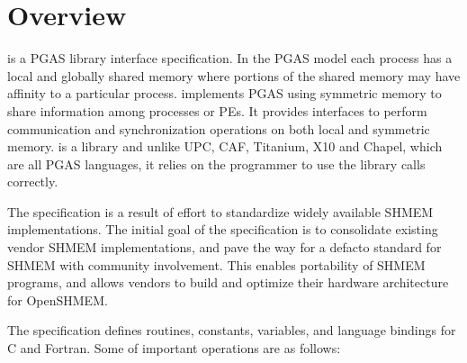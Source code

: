 \section{Overview}
\openshmem is a \ac{PGAS} library interface specification. In the \ac{PGAS} model each process has a local and 
globally shared memory where portions of the shared memory may have affinity to a particular process. \openshmem 
implements \ac{PGAS} using symmetric memory to share information among processes or \ac{PE}s.   
It provides interfaces to perform communication and synchronization operations on both local and symmetric memory. 
\openshmem is a library and unlike UPC, CAF, Titanium, X10 and Chapel, which are all
PGAS languages, it relies on the programmer to use the library calls correctly.

The \openshmem specification is a result of effort to standardize widely available SHMEM implementations. 
The initial goal of the specification is to consolidate existing vendor SHMEM implementations, and  pave the way for 
a defacto standard for SHMEM with community involvement. This enables portability of SHMEM programs, and 
allows vendors to build and optimize their hardware architecture for OpenSHMEM.

The \openshmem specification defines routines, constants, variables, and language bindings for C and Fortran.
Some of important \openshmem{} operations are as follows:

